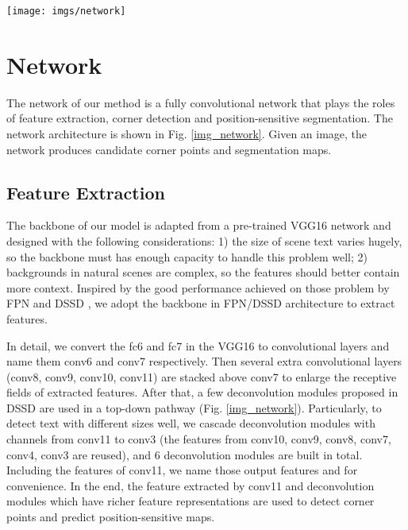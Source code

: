 \documentclass[10pt,twocolumn,letterpaper]{article}
\begin{document}
\begin{figure*}
\vspace{-3mm}

\begin{centering}
\texttt{[image: imgs/network]}
\par\end{centering}
\caption{Network Architecture. The network contains three parts: backbone, conner point detector and position-sensitive segmentation predictor. The backbone is adapted from DSSD \cite{fu2017dssd}. Conner point detectors are built on multiple feature layers (blocks in pink). position-sensitive segmentation predictor shares some features (pink blocks) with corner point detectors.}
\label{img_network}
\end{figure*}

\section{Network}

The network of our method is a fully convolutional network that plays the roles of feature extraction, corner detection and position-sensitive segmentation. The network architecture is shown in Fig. \ref{img_network}. Given an image, the network produces candidate corner points and segmentation maps.

\subsection{Feature Extraction}

The backbone of our model is adapted from a pre-trained VGG16 \cite{simonyan2014very} network and designed with the following considerations: 1) the size of scene text varies hugely, so the backbone must has enough capacity to handle this problem well; 2) backgrounds in natural scenes are complex, so the features should better contain more context. Inspired by the good performance achieved on those problem by FPN \cite{Lin_2017_CVPR} and DSSD \cite{fu2017dssd}, we adopt the backbone in FPN/DSSD architecture to extract features. 

In detail, we convert the fc6 and fc7 in the VGG16 to convolutional layers and name them conv6 and conv7 respectively. Then several extra convolutional layers (conv8, conv9, conv10, conv11) are stacked above conv7 to  enlarge the receptive fields of extracted features. After that, a few deconvolution modules proposed in DSSD \cite{fu2017dssd} are used in a top-down pathway (Fig. \ref{img_network}). Particularly, to detect text with different sizes well, we cascade deconvolution modules with  channels  from conv11 to conv3 (the features from conv10, conv9, conv8, conv7, conv4, conv3 are reused), and 6 deconvolution modules are built in total. Including the features of conv11, we name those output features  and  for convenience. In the end, the feature extracted by conv11 and deconvolution modules which have richer feature representations are used to detect corner points and predict position-sensitive maps.
\end{document}
